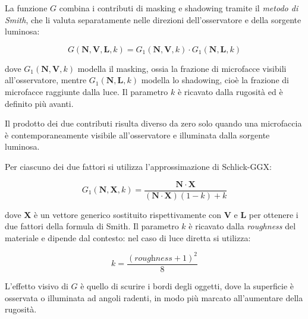 \documentclass[12pt,a4paper,twoside]{book}
\begin{document}
La funzione $G$ combina i contributi di masking e shadowing tramite il \textit{metodo di Smith}, che li valuta separatamente nelle direzioni dell'osservatore e della sorgente luminosa:

\begin{equation}
    G(\mathbf{N}, \mathbf{V}, \mathbf{L}, k) =
    G_1(\mathbf{N}, \mathbf{V}, k) \cdot G_1(\mathbf{N}, \mathbf{L}, k)
    \label{eq:smith}
\end{equation}

dove $G_1(\mathbf{N}, \mathbf{V}, k)$ modella il masking, ossia la frazione di microfacce visibili all'osservatore, mentre $G_1(\mathbf{N}, \mathbf{L}, k)$ modella lo shadowing, cioè la frazione di microfacce raggiunte dalla luce. Il parametro $k$ è ricavato dalla rugosità ed è definito più avanti.

Il prodotto dei due contributi risulta diverso da zero solo quando una microfaccia è contemporaneamente visibile all'osservatore e illuminata dalla sorgente luminosa.

Per ciascuno dei due fattori si utilizza l'approssimazione di Schlick-GGX:

\begin{equation}
    G_1(\mathbf{N}, \mathbf{X}, k) =
    \frac{\mathbf{N} \cdot \mathbf{X}}
    {(\mathbf{N} \cdot \mathbf{X})(1 - k) + k}
    \label{eq:schlick-ggx}
\end{equation}

dove $\mathbf{X}$ è un vettore generico sostituito rispettivamente con $\mathbf{V}$ e $\mathbf{L}$ per ottenere i due fattori della formula di Smith. Il parametro $k$ è ricavato dalla \textit{roughness} del materiale e dipende dal contesto: nel caso di luce diretta si utilizza:

\begin{equation}
    k = \frac{(\textit{roughness} + 1)^2}{8}
    \label{eq:k-direct}
\end{equation}

L'effetto visivo di $G$ è quello di scurire i bordi degli oggetti, dove la superficie è osservata o illuminata ad angoli radenti, in modo più marcato all'aumentare della rugosità.
\end{document}
